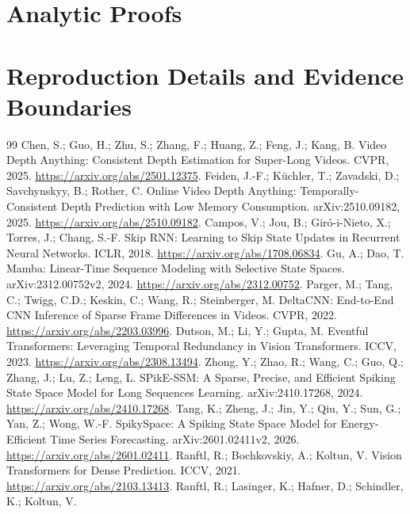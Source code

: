 \documentclass[mathematics,article,submit,moreauthors]{Definitions/mdpi}
\begin{document}
\appendixstart
\appendix
\section{Analytic Proofs}\label{app:proofs}

\section{Reproduction Details and Evidence Boundaries}\label{app:repro}


\begin{thebibliography}{99}
 Chen, S.; Guo, H.; Zhu, S.; Zhang, F.; Huang, Z.; Feng, J.; Kang, B.
Video Depth Anything: Consistent Depth Estimation for Super-Long Videos. CVPR, 2025.
\url{https://arxiv.org/abs/2501.12375}.
 Feiden, J.-F.; K\"uchler, T.; Zavadski, D.; Savchynskyy, B.; Rother, C.
Online Video Depth Anything: Temporally-Consistent Depth Prediction with Low Memory Consumption.
arXiv:2510.09182, 2025. \url{https://arxiv.org/abs/2510.09182}.
 Campos, V.; Jou, B.; Gir\'o-i-Nieto, X.; Torres, J.; Chang, S.-F.
Skip RNN: Learning to Skip State Updates in Recurrent Neural Networks. ICLR, 2018.
\url{https://arxiv.org/abs/1708.06834}.
 Gu, A.; Dao, T. Mamba: Linear-Time Sequence Modeling with Selective State Spaces.
arXiv:2312.00752v2, 2024. \url{https://arxiv.org/abs/2312.00752}.
 Parger, M.; Tang, C.; Twigg, C.D.; Keskin, C.; Wang, R.; Steinberger, M.
DeltaCNN: End-to-End CNN Inference of Sparse Frame Differences in Videos. CVPR, 2022.
\url{https://arxiv.org/abs/2203.03996}.
 Dutson, M.; Li, Y.; Gupta, M.
Eventful Transformers: Leveraging Temporal Redundancy in Vision Transformers. ICCV, 2023.
\url{https://arxiv.org/abs/2308.13494}.
 Zhong, Y.; Zhao, R.; Wang, C.; Guo, Q.; Zhang, J.; Lu, Z.; Leng, L.
SPikE-SSM: A Sparse, Precise, and Efficient Spiking State Space Model for Long Sequences Learning.
arXiv:2410.17268, 2024. \url{https://arxiv.org/abs/2410.17268}.
 Tang, K.; Zheng, J.; Jin, Y.; Qiu, Y.; Sun, G.; Yan, Z.; Wong, W.-F.
SpikySpace: A Spiking State Space Model for Energy-Efficient Time Series Forecasting.
arXiv:2601.02411v2, 2026. \url{https://arxiv.org/abs/2601.02411}.
 Ranftl, R.; Bochkovskiy, A.; Koltun, V.
Vision Transformers for Dense Prediction. ICCV, 2021. \url{https://arxiv.org/abs/2103.13413}.
 Ranftl, R.; Lasinger, K.; Hafner, D.; Schindler, K.; Koltun, V.

\end{thebibliography}
\end{document}
